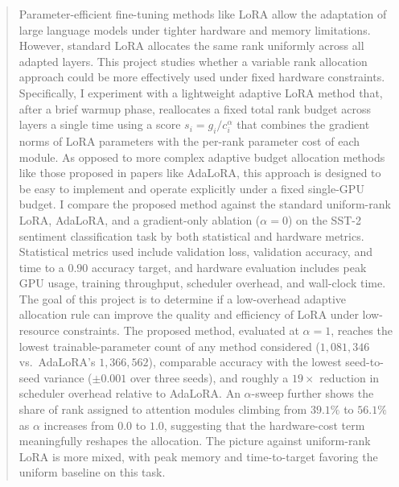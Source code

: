 \documentclass{article}
\begin{document}

\printAffiliationsAndNotice{}

\begin{abstract}
Parameter-efficient fine-tuning methods like LoRA allow the adaptation
of large language models under tighter hardware and memory limitations.
However, standard LoRA allocates the same rank uniformly across all
adapted layers. This project studies whether a variable rank allocation
approach could be more effectively used under fixed hardware
constraints. Specifically, I experiment with a lightweight adaptive
LoRA method that, after a brief warmup phase, reallocates a fixed total
rank budget across layers a single time using a score
$s_i = g_i / c_i^{\alpha}$ that combines the gradient norms of LoRA
parameters with the per-rank parameter cost of each module. As opposed
to more complex adaptive budget allocation methods like those proposed
in papers like AdaLoRA, this approach is designed to be easy to
implement and operate explicitly under a fixed single-GPU budget. I
compare the proposed method against the standard uniform-rank LoRA,
AdaLoRA, and a gradient-only ablation ($\alpha{=}0$) on the SST-2
sentiment classification task by both statistical and hardware metrics.
Statistical metrics used include validation loss, validation accuracy,
and time to a $0.90$ accuracy target, and hardware evaluation includes
peak GPU usage, training throughput, scheduler overhead, and
wall-clock time. The goal of this project is to determine if a
low-overhead adaptive allocation rule can improve the quality and
efficiency of LoRA under low-resource constraints. The proposed method,
evaluated at $\alpha{=}1$, reaches the lowest trainable-parameter count
of any method considered ($1{,}081{,}346$ vs.\ AdaLoRA's
$1{,}366{,}562$), comparable accuracy with the lowest seed-to-seed
variance ($\pm 0.001$ over three seeds), and roughly a $19\times$
reduction in scheduler overhead relative to AdaLoRA. An $\alpha$-sweep
further shows the share of rank assigned to attention modules climbing
from $39.1\%$ to $56.1\%$ as $\alpha$ increases from $0.0$ to $1.0$,
suggesting that the hardware-cost term meaningfully reshapes the
allocation. The picture against uniform-rank LoRA is more mixed, with
peak memory and time-to-target favoring the uniform baseline on this
task.
\end{abstract}
\end{document}
